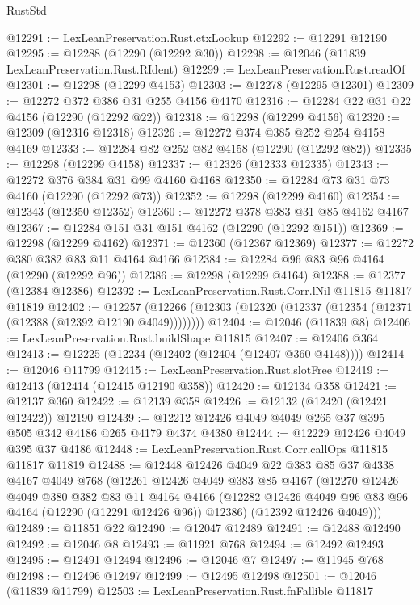\begin{lexlean}{RustStd}
\begin{coremodule}
{\begin{coremodule}
{{{{{{{{{{{{{{{{{{{{{{{{{{{{{{{{{{{{{{{{{{{{{{{{{{@12291 := LexLeanPreservation.Rust.ctxLookup
@12292 := @12291 @12190
@12295 := @12288 (@12290 (@12292 @30))
@12298 := @12046 (@11839 LexLeanPreservation.Rust.RIdent)
@12299 := LexLeanPreservation.Rust.readOf
@12301 := @12298 (@12299 @4153)
@12303 := @12278 (@12295 @12301)
@12309 := @12272 @372 @386 @31 @255 @4156 @4170
@12316 := @12284 @22 @31 @22 @4156 (@12290 (@12292 @22))
@12318 := @12298 (@12299 @4156)
@12320 := @12309 (@12316 @12318)
@12326 := @12272 @374 @385 @252 @254 @4158 @4169
@12333 := @12284 @82 @252 @82 @4158 (@12290 (@12292 @82))
@12335 := @12298 (@12299 @4158)
@12337 := @12326 (@12333 @12335)
@12343 := @12272 @376 @384 @31 @99 @4160 @4168
@12350 := @12284 @73 @31 @73 @4160 (@12290 (@12292 @73))
@12352 := @12298 (@12299 @4160)
@12354 := @12343 (@12350 @12352)
@12360 := @12272 @378 @383 @31 @85 @4162 @4167
@12367 := @12284 @151 @31 @151 @4162 (@12290 (@12292 @151))
@12369 := @12298 (@12299 @4162)
@12371 := @12360 (@12367 @12369)
@12377 := @12272 @380 @382 @83 @11 @4164 @4166
@12384 := @12284 @96 @83 @96 @4164 (@12290 (@12292 @96))
@12386 := @12298 (@12299 @4164)
@12388 := @12377 (@12384 @12386)
@12392 := LexLeanPreservation.Rust.Corr.lNil @11815 @11817 @11819
@12402 := @12257
    (@12266 (@12303 (@12320 (@12337 (@12354 (@12371 (@12388 (@12392 @12190 @4049))))))))
@12404 := @12046 (@11839 @8)
@12406 := LexLeanPreservation.Rust.buildShape @11815
@12407 := @12406 @364
@12413 := @12225 (@12234 (@12402 (@12404 (@12407 @360 @4148))))
@12414 := @12046 @11799
@12415 := LexLeanPreservation.Rust.slotFree
@12419 := @12413 (@12414 (@12415 @12190 @358))
@12420 := @12134 @358
@12421 := @12137 @360
@12422 := @12139 @358
@12426 := @12132 (@12420 (@12421 @12422)) @12190
@12439 := @12212 @12426 @4049 @4049 @265 @37 @395 @505 @342 @4186 @265 @4179 @4374 @4380
@12444 := @12229 @12426 @4049 @395 @37 @4186
@12448 := LexLeanPreservation.Rust.Corr.callOps @11815 @11817 @11819
@12488 := @12448
    @12426
    @4049
    @22
    @383
    @85
    @37
    @4338
    @4167
    @4049
    @768
    (@12261
      @12426
      @4049
      @383
      @85
      @4167
      (@12270
        @12426
        @4049
        @380
        @382
        @83
        @11
        @4164
        @4166
        (@12282 @12426 @4049 @96 @83 @96 @4164 (@12290 (@12291 @12426 @96)) @12386)
        (@12392 @12426 @4049)))
@12489 := @11851 @22
@12490 := @12047 @12489
@12491 := @12488 @12490
@12492 := @12046 @8
@12493 := @11921 @768
@12494 := @12492 @12493
@12495 := @12491 @12494
@12496 := @12046 @7
@12497 := @11945 @768
@12498 := @12496 @12497
@12499 := @12495 @12498
@12501 := @12046 (@11839 @11799)
@12503 := LexLeanPreservation.Rust.fnFallible @11817
}}}}}}}}}}}}}}}}}}}}}}}}}}}}}}}}}}}}}}}}}}}}}}}}}}
\end{coremodule}}
\end{coremodule}
\end{lexlean}
